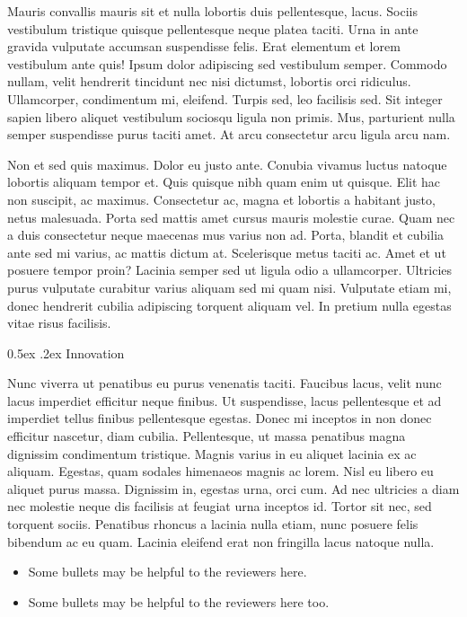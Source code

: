 \documentclass[11pt,]{article}
\makeatletter
\providecommand{\tightlist}{%
  \setlength{\itemsep}{0pt}\setlength{\parskip}{0pt}}
\renewcommand\subsection{
  \@startsection{subsection}{2}{\z@}
    {-1.5ex\@plus -1ex \@minus -.2ex}%
    {0.5ex \@plus .2ex}%
    {\normalfont\normalsize\bf}} %
\makeatother
\begin{document}
Mauris convallis mauris sit et nulla lobortis duis pellentesque, lacus.
Sociis vestibulum tristique quisque pellentesque neque platea taciti.
Urna in ante gravida vulputate accumsan suspendisse felis. Erat
elementum et lorem vestibulum ante quis! Ipsum dolor adipiscing sed
vestibulum semper. Commodo nullam, velit hendrerit tincidunt nec nisi
dictumst, lobortis orci ridiculus. Ullamcorper, condimentum mi,
eleifend. Turpis sed, leo facilisis sed. Sit integer sapien libero
aliquet vestibulum sociosqu ligula non primis. Mus, parturient nulla
semper suspendisse purus taciti amet. At arcu consectetur arcu ligula
arcu nam.

Non et sed quis maximus. Dolor eu justo ante. Conubia vivamus luctus
natoque lobortis aliquam tempor et. Quis quisque nibh quam enim ut
quisque. Elit hac non suscipit, ac maximus. Consectetur ac, magna et
lobortis a habitant justo, netus malesuada. Porta sed mattis amet cursus
mauris molestie curae. Quam nec a duis consectetur neque maecenas mus
varius non ad. Porta, blandit et cubilia ante sed mi varius, ac mattis
dictum at. Scelerisque metus taciti ac. Amet et ut posuere tempor proin?
Lacinia semper sed ut ligula odio a ullamcorper. Ultricies purus
vulputate curabitur varius aliquam sed mi quam nisi. Vulputate etiam mi,
donec hendrerit cubilia adipiscing torquent aliquam vel. In pretium
nulla egestas vitae risus facilisis.

\hypertarget{innovation}{%
\subsection{Innovation}\label{innovation}}

Nunc viverra ut penatibus eu purus venenatis taciti. Faucibus lacus,
velit nunc lacus imperdiet efficitur neque finibus. Ut suspendisse,
lacus pellentesque et ad imperdiet tellus finibus pellentesque egestas.
Donec mi inceptos in non donec efficitur nascetur, diam cubilia.
Pellentesque, ut massa penatibus magna dignissim condimentum tristique.
Magnis varius in eu aliquet lacinia ex ac aliquam. Egestas, quam sodales
himenaeos magnis ac lorem. Nisl eu libero eu aliquet purus massa.
Dignissim in, egestas urna, orci cum. Ad nec ultricies a diam nec
molestie neque dis facilisis at feugiat urna inceptos id. Tortor sit
nec, sed torquent sociis. Penatibus rhoncus a lacinia nulla etiam, nunc
posuere felis bibendum ac eu quam. Lacinia eleifend erat non fringilla
lacus natoque nulla.

\begin{itemize}
\tightlist
\item
  Some bullets may be helpful to the reviewers here.
\item
  Some bullets may be helpful to the reviewers here too.
\end{itemize}
\end{document}
